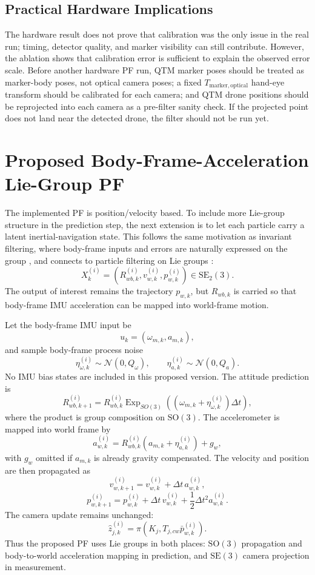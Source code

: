 \documentclass{aiaa-tc}
\newcommand{\SO}{\mathrm{SO}}
\newcommand{\SE}{\mathrm{SE}}
\newcommand{\SEtwo}{\mathrm{SE}_2(3)}
\newcommand{\Exp}{\operatorname{Exp}}
\newcommand{\N}{\mathcal{N}}
\begin{document}
\subsection{Practical Hardware Implications}

The hardware result does not prove that calibration was the only issue in the
real run; timing, detector quality, and marker visibility can still contribute.
However, the ablation shows that calibration error is sufficient to explain the
observed error scale.  Before another hardware PF run, QTM marker poses should
be treated as marker-body poses, not optical camera poses; a fixed
\(T_{\mathrm{marker},\mathrm{optical}}\) hand-eye transform should be calibrated
for each camera; and QTM drone positions should be reprojected into each camera
as a pre-filter sanity check.  If the projected point does not land near the
detected drone, the filter should not be run yet.

\section{Proposed Body-Frame-Acceleration Lie-Group PF}

The implemented PF is position/velocity based.  To include more Lie-group
structure in the prediction step, the next extension is to let each particle
carry a latent inertial-navigation state.  This follows the same motivation as
invariant filtering, where body-frame inputs and errors are naturally expressed
on the group \cite{barrau2017}, and connects to particle filtering on Lie
groups \cite{fpf_lg,chahbazian2023}:
\[
X_k^{(i)}
=
\left(
R_{wb,k}^{(i)},v_{w,k}^{(i)},p_{w,k}^{(i)}
\right)
\in \SEtwo.
\]
The output of interest remains the trajectory \(p_{w,k}\), but \(R_{wb,k}\) is
carried so that body-frame IMU acceleration can be mapped into world-frame
motion.

Let the body-frame IMU input be
\[
u_k=(\omega_{m,k},a_{m,k}),
\]
and sample body-frame process noise
\[
\eta_{\omega,k}^{(i)}\sim \N(0,Q_\omega),
\qquad
\eta_{a,k}^{(i)}\sim \N(0,Q_a).
\]
No IMU bias states are included in this proposed version.  The attitude
prediction is
\[
R_{wb,k+1}^{(i)}
=
R_{wb,k}^{(i)}
\Exp_{SO(3)}
\left(
(\omega_{m,k}+\eta_{\omega,k}^{(i)})\Delta t
\right),
\]
where the product is group composition on \(\SO(3)\).  The accelerometer is
mapped into world frame by
\[
a_{w,k}^{(i)}
=
R_{wb,k}^{(i)}
\left(a_{m,k}+\eta_{a,k}^{(i)}\right)
+g_w,
\]
with \(g_w\) omitted if \(a_{m,k}\) is already gravity compensated.  The
velocity and position are then propagated as
\[
v_{w,k+1}^{(i)}
=
v_{w,k}^{(i)}
+\Delta t\,a_{w,k}^{(i)},
\]
\[
p_{w,k+1}^{(i)}
=
p_{w,k}^{(i)}
+\Delta t\,v_{w,k}^{(i)}
+\frac{1}{2}\Delta t^2a_{w,k}^{(i)}.
\]
The camera update remains unchanged:
\[
\hat z_{j,k}^{(i)}
=
\pi(K_j,T_{j,cw}\bar p_{w,k}^{(i)}).
\]
Thus the proposed PF uses Lie groups in both places: \(\SO(3)\) propagation and
body-to-world acceleration mapping in prediction, and \(\SE(3)\) camera
projection in measurement.
\end{document}
